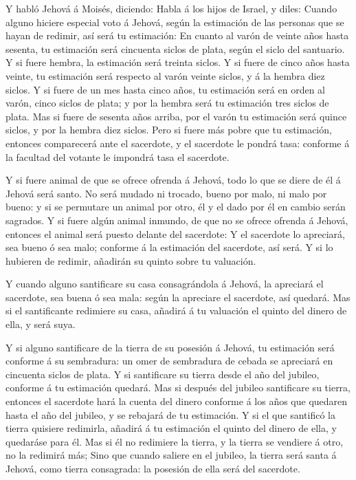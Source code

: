  Y habló Jehová á Moisés, diciendo:  Habla á
los hijos de Israel, y diles: Cuando alguno hiciere especial voto á
Jehová, según la estimación de las personas que se hayan de redimir, así
será tu estimación:  En cuanto al varón de veinte años
hasta sesenta, tu estimación será cincuenta siclos de plata, según el
siclo del santuario.  Y si fuere hembra, la estimación
será treinta siclos.  Y si fuere de cinco años hasta
veinte, tu estimación será respecto al varón veinte siclos, y á la
hembra diez siclos.  Y si fuere de un mes hasta cinco
años, tu estimación será en orden al varón, cinco siclos de plata; y por
la hembra será tu estimación tres siclos de plata.  Mas si
fuere de sesenta años arriba, por el varón tu estimación será quince
siclos, y por la hembra diez siclos.  Pero si fuere más
pobre que tu estimación, entonces comparecerá ante el sacerdote, y el
sacerdote le pondrá tasa: conforme á la facultad del votante le impondrá
tasa el sacerdote.

 Y si fuere animal de que se ofrece ofrenda á Jehová, todo
lo que se diere de él á Jehová será santo.  No será
mudado ni trocado, bueno por malo, ni malo por bueno: y si se permutare
un animal por otro, él y el dado por él en cambio serán sagrados.
 Y si fuere algún animal inmundo, de que no se ofrece
ofrenda á Jehová, entonces el animal será puesto delante del sacerdote:
 Y el sacerdote lo apreciará, sea bueno ó sea malo;
conforme á la estimación del sacerdote, así será.  Y si
lo hubieren de redimir, añadirán su quinto sobre tu valuación.

 Y cuando alguno santificare su casa consagrándola á
Jehová, la apreciará el sacerdote, sea buena ó sea mala: según la
apreciare el sacerdote, así quedará.  Mas si el
santificante redimiere su casa, añadirá á tu valuación el quinto del
dinero de ella, y será suya.

 Y si alguno santificare de la tierra de su posesión á
Jehová, tu estimación será conforme á su sembradura: un omer de
sembradura de cebada se apreciará en cincuenta siclos de plata.
 Y si santificare su tierra desde el año del jubileo,
conforme á tu estimación quedará.  Mas si después del
jubileo santificare su tierra, entonces el sacerdote hará la cuenta del
dinero conforme á los años que quedaren hasta el año del jubileo, y se
rebajará de tu estimación.  Y si el que santificó la
tierra quisiere redimirla, añadirá á tu estimación el quinto del dinero
de ella, y quedaráse para él.  Mas si él no redimiere la
tierra, y la tierra se vendiere á otro, no la redimirá más;
 Sino que cuando saliere en el jubileo, la tierra será
santa á Jehová, como tierra consagrada: la posesión de ella será del
sacerdote.

